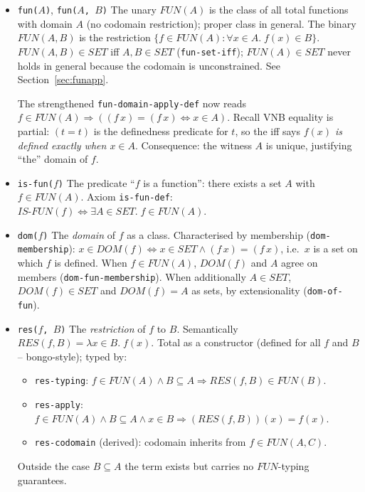\begin{itemize}
\item \texttt{fun($A$)}, \texttt{fun($A$, $B$)}
  The unary $\mathit{FUN}(A)$ is the class of all total functions with
  domain $A$ (no codomain restriction); proper class in general.  The
  binary $\mathit{FUN}(A,B)$ is the restriction
  $\{f \in \mathit{FUN}(A) : \forall x \in A.\;f(x) \in B\}$.
  $\mathit{FUN}(A,B) \in \mathit{SET}$ iff $A, B \in \mathit{SET}$
  (\texttt{fun-set-iff}); $\mathit{FUN}(A) \in \mathit{SET}$ never holds
  in general because the codomain is unconstrained.
  See Section~\ref{sec:funapp}.

  The strengthened \texttt{fun-domain-apply-def} now reads
  $f \in \mathit{FUN}(A) \Rightarrow ((f\,x) = (f\,x) \Leftrightarrow x \in A)$.
  Recall VNB equality is partial: $(t = t)$ is the definedness predicate
  for $t$, so the iff says \emph{$f(x)$ is defined exactly when $x \in A$}.
  Consequence: the witness $A$ is unique, justifying ``the'' domain of $f$.

\item \texttt{is-fun($f$)}
  The predicate ``$f$ is a function'': there exists a set $A$ with
  $f \in \mathit{FUN}(A)$.  Axiom \texttt{is-fun-def}:
  $\mathit{IS\text{-}FUN}(f) \Leftrightarrow \exists A \in \mathit{SET}.\;
   f \in \mathit{FUN}(A)$.

\item \texttt{dom($f$)}
  The \emph{domain} of $f$ as a class.  Characterised by membership
  (\texttt{dom-membership}):
  $x \in \mathit{DOM}(f) \Leftrightarrow x \in \mathit{SET}
   \land (f\,x) = (f\,x)$, i.e.\ $x$ is a set on which $f$ is defined.
  When $f \in \mathit{FUN}(A)$, $\mathit{DOM}(f)$ and $A$ agree on
  members (\texttt{dom-fun-membership}).  When additionally
  $A \in \mathit{SET}$, $\mathit{DOM}(f) \in \mathit{SET}$ and
  $\mathit{DOM}(f) = A$ as sets, by extensionality
  (\texttt{dom-of-fun}).

\item \texttt{res($f$, $B$)}
  The \emph{restriction} of $f$ to $B$.  Semantically
  $\mathit{RES}(f, B) = \lambda x \in B.\;f(x)$.  Total as a constructor
  (defined for all $f$ and $B$ -- bongo-style); typed by:
  \begin{itemize}
  \item \texttt{res-typing}:
    $f \in \mathit{FUN}(A) \land B \subseteq A
    \Rightarrow \mathit{RES}(f, B) \in \mathit{FUN}(B)$.
  \item \texttt{res-apply}:
    $f \in \mathit{FUN}(A) \land B \subseteq A \land x \in B
    \Rightarrow (\mathit{RES}(f, B))(x) = f(x)$.
  \item \texttt{res-codomain} (derived): codomain inherits from
    $f \in \mathit{FUN}(A, C)$.
  \end{itemize}
  Outside the case $B \subseteq A$ the term exists but carries no
  $\mathit{FUN}$-typing guarantees.


\end{itemize}
